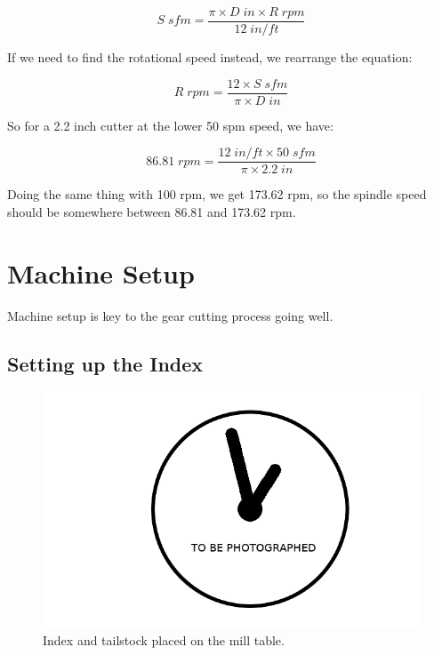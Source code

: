\documentclass[12pt,twoside,letterpaper]{article}
\begin{document}
	\[S \;sfm = \frac{\pi \times D \; in \times R \;rpm}{12 \; in/ft}\]

If we need to find the rotational speed instead, we rearrange the equation:

	\[R\; rpm= \frac{12 \times S \;sfm}{\pi \times D \;in}\]

So for a 2.2 inch cutter at the lower 50 spm speed, we have:

	\[86.81 \; rpm = \frac{12\;  in/ft \times 50\;  sfm }{\pi \times 2.2\;  in} \]

Doing the same thing with 100 rpm, we get 173.62 rpm, so the spindle speed should be somewhere between 86.81 and 173.62 rpm. 
	 


\section{Machine Setup}
Machine setup is key to the gear cutting process going well. 



\subsection{Setting up the Index}
\begin{figure}[H]
\centering
\includegraphics[width=5in]{imgpending}
	\caption{Index and tailstock placed on the mill table.}
\end{figure}
\end{document}
